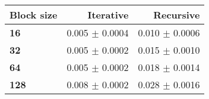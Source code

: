 \begin{tabular}{lrr}\toprule
\textbf{Block size}  & \textbf{Iterative} & \textbf{Recursive}\\\midrule
\textbf{16}  & 0.005 $\pm$ 0.0004 & 0.010 $\pm$ 0.0006\\
\textbf{32}  & 0.005 $\pm$ 0.0002 & 0.015 $\pm$ 0.0010\\
\textbf{64}  & 0.005 $\pm$ 0.0002 & 0.018 $\pm$ 0.0014\\
\textbf{128} & 0.008 $\pm$ 0.0002 & 0.028 $\pm$ 0.0016\\
\bottomrule
\end{tabular}
